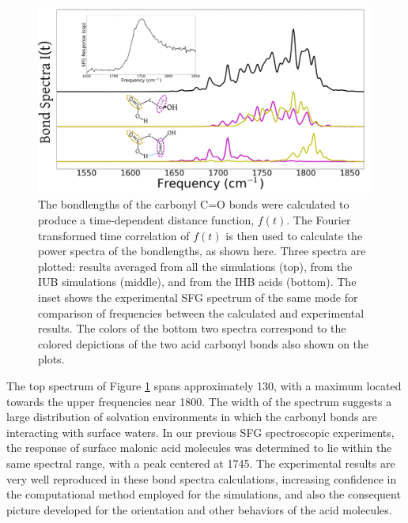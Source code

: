 \begin{figure}[h!]
	\begin{center}
		\includegraphics[scale=1.0]{images/bond-spectra/BondSpectra.png}
		\caption{The bondlengths of the carbonyl C=O bonds were calculated to produce a time-dependent distance function, $f(t)$. The Fourier transformed time correlation of $f(t)$ is then used to calculate the power spectra of the bondlengths, as shown here. Three spectra are plotted: results averaged from all the simulations (top), from the IUB simulations (middle), and from the IHB acids (bottom). The inset shows the experimental SFG spectrum of the same mode for comparison of frequencies between the calculated and experimental results. The colors of the bottom two spectra correspond to the colored depictions of the two acid carbonyl bonds also shown on the plots.}
		\label{fig:bond-spectra}
	\end{center}
\end{figure}

The top spectrum of Figure \ref{fig:bond-spectra} spans approximately 130\cm, with a maximum located towards the upper frequencies near 1800\cm. The width of the spectrum suggests a large distribution of solvation environments in which the carbonyl bonds are interacting with surface waters. In our previous SFG spectroscopic experiments, the response of surface malonic acid molecules was determined to lie within the same spectral range, with a peak centered at 1745\cm. The experimental results are very well reproduced in these bond spectra calculations, increasing confidence in the computational method employed for the simulations, and also the consequent picture developed for the orientation and other behaviors of the acid molecules.

